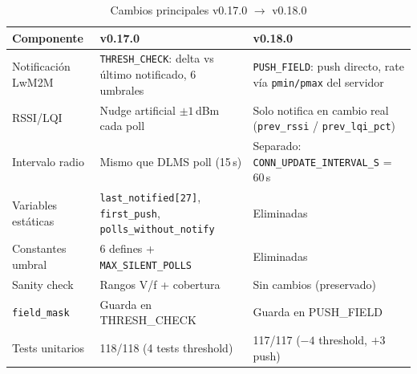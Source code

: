 \begin{table}[htbp]
\centering
\caption{Cambios principales v0.17.0 $\rightarrow$ v0.18.0}
\label{tab:changes_v018}
\begin{tabular}{@{}p{3.5cm}p{4.5cm}p{5.5cm}@{}}
\toprule
\textbf{Componente} & \textbf{v0.17.0} & \textbf{v0.18.0} \\
\midrule
Notificación LwM2M & \texttt{THRESH\_CHECK}: delta vs último notificado, 6 umbrales & \texttt{PUSH\_FIELD}: push directo, rate vía \texttt{pmin/pmax} del servidor \\
\addlinespace
RSSI/LQI & Nudge artificial $\pm 1$\,dBm cada poll & Solo notifica en cambio real (\texttt{prev\_rssi} / \texttt{prev\_lqi\_pct}) \\
\addlinespace
Intervalo radio & Mismo que DLMS poll (15\,s) & Separado: \texttt{CONN\_UPDATE\_INTERVAL\_S} = 60\,s \\
\addlinespace
Variables estáticas & \texttt{last\_notified[27]}, \texttt{first\_push}, \texttt{polls\_without\_notify} & Eliminadas \\
\addlinespace
Constantes umbral & 6 defines + \texttt{MAX\_SILENT\_POLLS} & Eliminadas \\
\addlinespace
Sanity check & Rangos V/f + cobertura & Sin cambios (preservado) \\
\addlinespace
\texttt{field\_mask} & Guarda en THRESH\_CHECK & Guarda en PUSH\_FIELD \\
\addlinespace
Tests unitarios & 118/118 (4 tests threshold) & 117/117 ($-4$ threshold, $+3$ push) \\
\bottomrule
\end{tabular}
\end{table}
